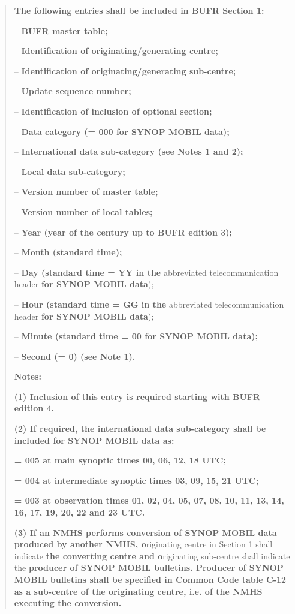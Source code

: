 \begin{quote}
\textbf{The following entries shall be included in BUFR Section 1:}

-- \textbf{BUFR master table;}

-- \textbf{Identification of originating/generating centre;}

-- \textbf{Identification of originating/generating sub-centre;}

-- \textbf{Update sequence number;}

-- \textbf{Identification of inclusion of optional section;}

-- \textbf{Data category (= 000 for SYNOP MOBIL data);}

-- \textbf{International data sub-category (see Notes 1 and 2);}

-- \textbf{Local data sub-category;}

-- \textbf{Version number of master table;}

-- \textbf{Version number of local tables;}

-- \textbf{Year (year of the century up to BUFR edition 3);}

-- \textbf{Month (standard time);}

-- \textbf{Day (standard time = YY in the} abbreviated telecommunication header \textbf{for SYNOP MOBIL data});

-- \textbf{Hour (standard time = GG in the} abbreviated telecommunication header \textbf{for SYNOP MOBIL data});

-- \textbf{Minute (standard time = 00 for SYNOP MOBIL data);}

-- \textbf{Second (= 0) (see Note 1).}

\textbf{Notes:}

\textbf{(1) Inclusion of this entry is required starting with BUFR edition 4.}

\textbf{(2) If required, the international data sub-category shall be included for SYNOP MOBIL data as:}

\textbf{= 005 at main synoptic times 00, 06, 12, 18 UTC;}

\textbf{= 004 at intermediate synoptic times 03, 09, 15, 21 UTC;}

\textbf{= 003 at observation times 01, 02, 04, 05, 07, 08, 10, 11, 13, 14, 16, 17, 19, 20, 22 and 23 UTC.}

\textbf{(3) If an NMHS performs conversion of SYNOP MOBIL data produced by another NMHS, o}riginating centre in Section 1 shall indicate \textbf{the converting centre and o}riginating sub-centre shall indicate the \textbf{producer of SYNOP MOBIL bulletins. Producer of SYNOP MOBIL bulletins shall be specified in Common Code table C-12 as a sub-centre of the originating centre, i.e. of the NMHS executing the conversion.}
\end{quote}

